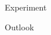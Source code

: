 \documentclass{beamer}
\begin{document}
\begin{frame}{Experiment}
\end{frame}


\begin{frame}{Outlook}
\end{frame}

\begin{frame}{}
\end{frame}
\end{document}
